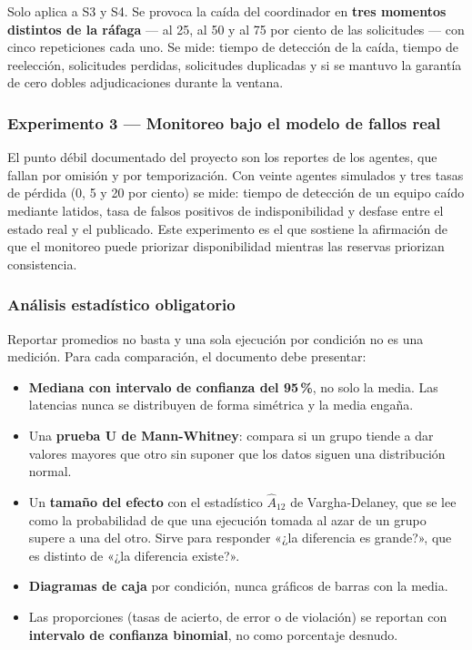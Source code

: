 \documentclass[11pt,a4paper]{article}
\begin{document}
	Solo aplica a S3 y S4. Se provoca la caída del coordinador en \textbf{tres momentos distintos de la ráfaga} --- al 25, al 50 y al 75 por ciento de las solicitudes --- con cinco repeticiones cada uno. Se mide: tiempo de detección de la caída, tiempo de reelección, solicitudes perdidas, solicitudes duplicadas y si se mantuvo la garantía de cero dobles adjudicaciones durante la ventana.
	
	\subsubsection{Experimento 3 --- Monitoreo bajo el modelo de fallos real}
	
	El punto débil documentado del proyecto son los reportes de los agentes, que fallan por omisión y por temporización. Con veinte agentes simulados y tres tasas de pérdida (0, 5 y 20 por ciento) se mide: tiempo de detección de un equipo caído mediante latidos, tasa de falsos positivos de indisponibilidad y desfase entre el estado real y el publicado. Este experimento es el que sostiene la afirmación de que el monitoreo puede priorizar disponibilidad mientras las reservas priorizan consistencia.
	
	\subsubsection{Análisis estadístico obligatorio}
	
	Reportar promedios no basta y una sola ejecución por condición no es una medición. Para cada comparación, el documento debe presentar:
	
	\begin{itemize}[leftmargin=*,itemsep=4pt]
		\item \textbf{Mediana con intervalo de confianza del 95\,\%}, no solo la media. Las latencias nunca se distribuyen de forma simétrica y la media engaña.
		\item Una \textbf{prueba U de Mann-Whitney}: compara si un grupo tiende a dar valores mayores que otro sin suponer que los datos siguen una distribución normal.
		\item Un \textbf{tamaño del efecto} con el estadístico $\hat{A}_{12}$ de Vargha-Delaney, que se lee como la probabilidad de que una ejecución tomada al azar de un grupo supere a una del otro. Sirve para responder «¿la diferencia es grande?», que es distinto de «¿la diferencia existe?».
		\item \textbf{Diagramas de caja} por condición, nunca gráficos de barras con la media.
		\item Las proporciones (tasas de acierto, de error o de violación) se reportan con \textbf{intervalo de confianza binomial}, no como porcentaje desnudo.
	\end{itemize}
	
\end{document}
